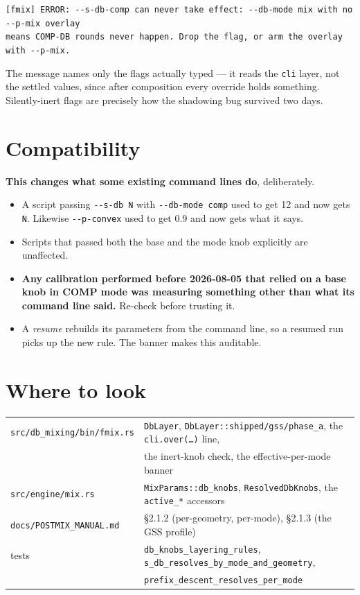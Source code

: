 \documentclass[11pt]{article}
\newcommand{\code}[1]{\texttt{#1}}
\begin{document}
\begin{center}\footnotesize
\code{[fmix] ERROR: -{}-s-db-comp can never take effect: -{}-db-mode mix with no -{}-p-mix overlay}\\
\code{means COMP-DB rounds never happen. Drop the flag, or arm the overlay with -{}-p-mix.}
\end{center}

The message names only the flags actually typed --- it reads the \code{cli}
layer, not the settled values, since after composition every override holds
something. Silently-inert flags are precisely how the shadowing bug survived
two days.

\section{Compatibility}

\textbf{This changes what some existing command lines do}, deliberately.

\begin{itemize}
\item A script passing \code{-{}-s-db N} with \code{-{}-db-mode comp} used to
get 12 and now gets \code{N}. Likewise \code{-{}-p-convex} used to get 0.9 and
now gets what it says.
\item Scripts that passed both the base and the mode knob explicitly are
unaffected.
\item \textbf{Any calibration performed before 2026-08-05 that relied on a
base knob in COMP mode was measuring something other than what its command
line said.} Re-check before trusting it.
\item A \emph{resume} rebuilds its parameters from the command line, so a
resumed run picks up the new rule. The banner makes this auditable.
\end{itemize}

\section{Where to look}

\begin{center}\small
\begin{tabular}{ll}
\toprule
\code{src/db\_mixing/bin/fmix.rs} & \code{DbLayer}, \code{DbLayer::shipped/gss/phase\_a}, the \code{cli.over(\dots)} line, \\
 & the inert-knob check, the effective-per-mode banner \\
\code{src/engine/mix.rs} & \code{MixParams::db\_knobs}, \code{ResolvedDbKnobs}, the \code{active\_*} accessors \\
\code{docs/POSTMIX\_MANUAL.md} & \S2.1.2 (per-geometry, per-mode), \S2.1.3 (the GSS profile) \\
tests & \code{db\_knobs\_layering\_rules}, \code{s\_db\_resolves\_by\_mode\_and\_geometry}, \\
 & \code{prefix\_descent\_resolves\_per\_mode} \\
\bottomrule
\end{tabular}
\end{center}
\end{document}
